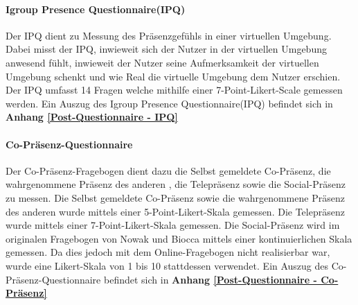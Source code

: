\documentclass[a4paper,11pt]{article}%
\renewcommand{\\}{\vspace*{0.5\baselineskip} \newline}
\begin{document}
		\paragraph{Igroup Presence Questionnaire(IPQ)}
Der IPQ dient zu Messung des Präsenzgefühls in einer virtuellen Umgebung. Dabei misst der IPQ, inwieweit sich der Nutzer in der virtuellen Umgebung anwesend fühlt, inwieweit der Nutzer seine Aufmerksamkeit der virtuellen Umgebung schenkt und wie Real die virtuelle Umgebung dem Nutzer erschien. Der IPQ umfasst 14 Fragen welche mithilfe einer 7-Point-Likert-Scale gemessen werden.
\\Ein Auszug des Igroup Presence Questionnaire(IPQ) befindet sich in \textbf{Anhang \ref{Post-Questionnaire - IPQ}}
		
		\paragraph{Co-Präsenz-Questionnaire}
Der Co-Präsenz-Fragebogen dient dazu die Selbst gemeldete Co-Präsenz, die wahrgenommene Präsenz des \flqq anderen \frqq, die Telepräsenz sowie die Social-Präsenz zu messen. Die Selbst gemeldete Co-Präsenz sowie die wahrgenommene Präsenz des \flqq anderen \frqq wurde mittels einer 5-Point-Likert-Skala gemessen. Die Telepräsenz wurde mittels einer 7-Point-Likert-Skala gemessen. Die Social-Präsenz wird im originalen Fragebogen von Nowak und Biocca mittels einer kontinuierlichen Skala gemessen. Da dies jedoch mit dem Online-Fragebogen nicht realisierbar war, wurde eine Likert-Skala von 1 bis 10 stattdessen verwendet. \citep[p.487]{nowak2004effect}
\\Ein Auszug des Co-Präsenz-Questionnaire befindet sich in \textbf{Anhang \ref{Post-Questionnaire - Co-Präsenz}}
\end{document}
